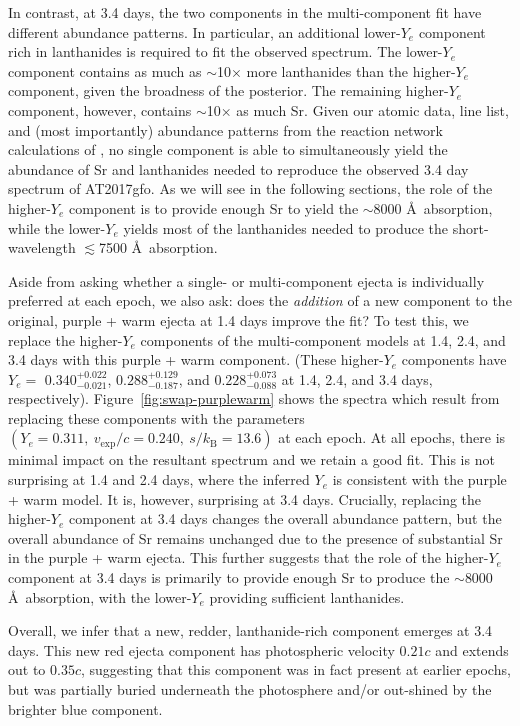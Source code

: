 \documentclass[twocolumn,twocolappendix]{aastex63}
\begin{document}
In contrast, at 3.4 days, the two components in the multi-component fit have different abundance patterns. In particular, an additional lower-$Y_e$ component rich in lanthanides is required to fit the observed spectrum. The lower-$Y_e$ component contains as much as $\sim$10$\times$ more lanthanides than the higher-$Y_e$ component, given the broadness of the posterior. The remaining higher-$Y_e$ component, however, contains $\sim$10$\times$ as much Sr. Given our atomic data, line list, and (most importantly) abundance patterns from the reaction network calculations of \cite{wanajo18}, no single component is able to simultaneously yield the abundance of Sr and lanthanides needed to reproduce the observed 3.4 day spectrum of AT2017gfo. As we will see in the following sections, the role of the higher-$Y_e$ component is to provide enough Sr to yield the $\sim$8000 \AA~absorption, while the lower-$Y_e$ yields most of the lanthanides needed to produce the short-wavelength $\lesssim$7500 \AA~absorption. 

Aside from asking whether a single- or multi-component ejecta is individually preferred at each epoch, we also ask: does the \textit{addition} of a new component to the original, purple + warm ejecta at 1.4 days improve the fit? To test this, we replace the higher-$Y_e$ components of the multi-component models at 1.4, 2.4, and 3.4 days with this purple + warm component. (These higher-$Y_e$ components have $Y_{e} = $ $ 0.340^{+0.022}_{-0.021}$, $0.288^{+0.129}_{-0.187}$, and $0.228^{+0.073}_{-0.088}$ at 1.4, 2.4, and 3.4 days, respectively). Figure~\ref{fig:swap-purplewarm} shows the spectra which result from replacing these components with the parameters $(Y_e = 0.311,~v_{\mathrm{exp}}/c=0.240,~s / k_{\mathrm{B}}=13.6)$ at each epoch. At all epochs, there is minimal impact on the resultant spectrum and we retain a good fit.  This is not surprising at 1.4 and 2.4 days, where the inferred $Y_e$ is consistent with the purple + warm model. It is, however, surprising at 3.4 days. Crucially, replacing the higher-$Y_e$ component at 3.4 days changes the overall abundance pattern, but the overall abundance of Sr remains unchanged due to the presence of substantial Sr in the purple + warm ejecta. This further suggests that the role of the higher-$Y_e$ component at 3.4 days is primarily to provide enough Sr to produce the $\sim$8000 \AA~absorption, with the lower-$Y_e$ providing sufficient lanthanides. 

Overall, we infer that a new, redder, lanthanide-rich component emerges at 3.4 days. This new red ejecta component has photospheric velocity $0.21c$ and extends out to $0.35c$, suggesting that this component was in fact present at earlier epochs, but was partially buried underneath the photosphere and/or out-shined by the brighter blue component.
\end{document}
